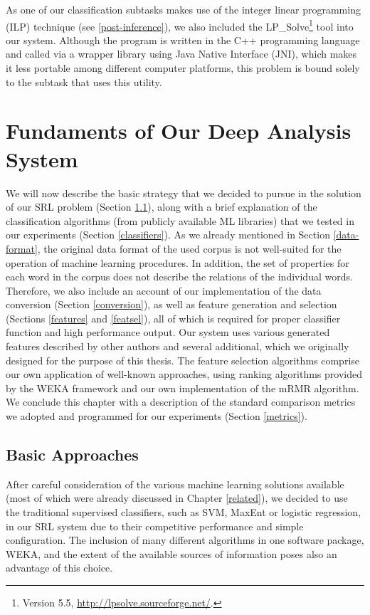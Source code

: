 \documentclass[12pt,notitlepage]{report}
\begin{document}
As one of our classification subtasks makes use of the integer linear programming (ILP) technique (see \ref{post-inference}), we also included the LP\_Solve\footnote{Version 5.5, \url{http://lpsolve.sourceforge.net/}.} tool into our system. Although the program is written in the C++ programming language and called via a wrapper library using Java Native Interface (JNI), which makes it less portable among different computer platforms, this problem is bound solely to the subtask that uses this utility.

%
%
\chapter{Fundaments of Our Deep Analysis System}\label{ml-semantic}
%
%

We will now describe the basic strategy that we decided to pursue in the solution of our SRL problem (Section \ref{approach}), along with a brief explanation of the classification algorithms (from publicly available ML libraries) that we tested in our experiments (Section \ref{classifiers}). As we already mentioned in Section \ref{data-format}, the original data format of the used corpus is not well-suited for the operation of machine learning procedures. In addition, the set of properties for each word in the corpus does not describe the relations of the individual words. Therefore, we also include an account of our implementation of the data conversion (Section \ref{conversion}), as well as feature generation and selection (Sections \ref{features} and \ref{featsel}), all of which is required for proper classifier function and high performance output. Our system uses various generated features described by other authors and several additional, which we originally designed for the purpose of this thesis. The feature selection algorithms comprise our own application of well-known approaches, using ranking algorithms provided by the WEKA framework and our own implementation of the mRMR algorithm. We conclude this chapter with a description of the standard comparison metrics we adopted and programmed for our experiments (Section \ref{metrics}).

\section{Basic Approaches}\label{approach}

After careful consideration of the various machine learning solutions available (most of which were already discussed in Chapter \ref{related}), we decided to use the traditional supervised classifiers, such as SVM, MaxEnt or logistic regression, in our SRL system due to their competitive performance and simple configuration. The inclusion of many different algorithms in one software package, WEKA, and the extent of the available sources of information poses also an advantage of this choice.
\end{document}

